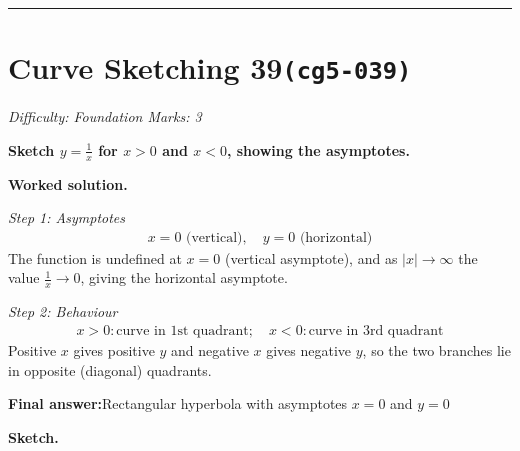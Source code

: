 \documentclass[11pt]{article}
\newcommand{\question}[1]{\par\medskip\noindent\textbf{#1}\par}
\begin{document}
\medskip\hrule

\section*{Curve Sketching 39\quad\small\texttt{(cg5-039)}}
\textit{Difficulty: Foundation \quad\textbar\quad Marks: 3}

\question{Sketch \( y = \frac{1}{x} \) for \( x > 0 \) and \( x < 0 \), showing the asymptotes.}

\textbf{Worked solution.}

\textit{Step 1: Asymptotes}
\[\begin{gathered}
x = 0 \text{ (vertical)}, \quad y = 0 \text{ (horizontal)}
\end{gathered}\]
The function is undefined at \( x = 0 \) (vertical asymptote), and as \( |x| \to \infty \) the value \( \tfrac{1}{x} \to 0 \), giving the horizontal asymptote.

\textit{Step 2: Behaviour}
\[\begin{gathered}
x > 0: \text{curve in 1st quadrant}; \quad x < 0: \text{curve in 3rd quadrant}
\end{gathered}\]
Positive \( x \) gives positive \( y \) and negative \( x \) gives negative \( y \), so the two branches lie in opposite (diagonal) quadrants.

\begin{answerbox}
\textbf{Final answer:}\quad Rectangular hyperbola with asymptotes \(\displaystyle x = 0\) and \(\displaystyle y = 0\)
\end{answerbox}
\textbf{Sketch.}
\end{document}
